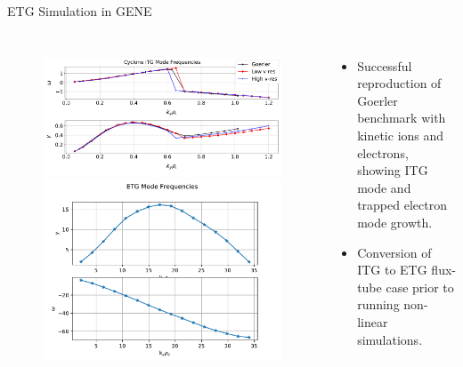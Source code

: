 \documentclass[aspectratio=43]{beamer}
\begin{document}
   \begin{frame}{ETG Simulation in GENE}
      \begin{columns}
         \begin{figure}
            \includegraphics[width=.8\textwidth,height=.3\textheight]{Images/LinearITG_KinEl_GrowthRates.pdf}
            \includegraphics[width=.8\textwidth]{Images/GrowthRates_ETG.pdf}
         \end{figure}
         \begin{itemize}
            \item Successful reproduction of Goerler benchmark with kinetic ions and electrons, showing ITG mode and trapped electron mode growth.
            \item Conversion of ITG to ETG flux-tube case prior to running non-linear simulations.
         \end{itemize}
      \end{columns}
   \end{frame}
\end{document}
